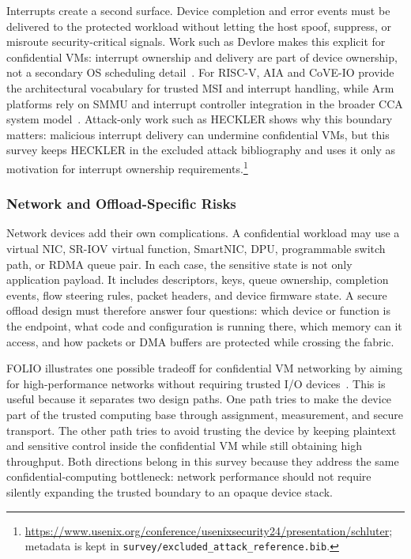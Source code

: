 Interrupts create a second surface. Device completion and error events must be
delivered to the protected workload without letting the host spoof, suppress, or
misroute security-critical signals. Work such as Devlore makes this explicit
for confidential VMs: interrupt ownership and delivery are part of device
ownership, not a secondary OS scheduling detail~\cite{bertschi2026devlore}.
For RISC-V, AIA and CoVE-IO provide the architectural vocabulary for trusted MSI
and interrupt handling, while Arm platforms rely on SMMU and interrupt
controller integration in the broader CCA system model~\cite{riscv_aia_2023,riscv_cove_io_2026,arm_smmu_spec}.
Attack-only work such as HECKLER shows why this boundary matters: malicious
interrupt delivery can undermine confidential VMs, but this survey keeps
HECKLER in the excluded attack bibliography and uses it only as motivation for
interrupt ownership requirements.\footnote{\url{https://www.usenix.org/conference/usenixsecurity24/presentation/schluter};
metadata is kept in \texttt{survey/excluded\_attack\_reference.bib}.}

\subsubsection{Network and Offload-Specific Risks}

Network devices add their own complications. A confidential workload may use a
virtual NIC, SR-IOV virtual function, SmartNIC, DPU, programmable switch path,
or RDMA queue pair. In each case, the sensitive state is not only application
payload. It includes descriptors, keys, queue ownership, completion events,
flow steering rules, packet headers, and device firmware state. A secure
offload design must therefore answer four questions: which device or function
is the endpoint, what code and configuration is running there, which memory can
it access, and how packets or DMA buffers are protected while crossing the
fabric.

FOLIO illustrates one possible tradeoff for confidential VM networking by
aiming for high-performance networks without requiring trusted I/O
devices~\cite{li2024folio}. This is useful because it separates two design
paths. One path tries to make the device part of the trusted computing base
through assignment, measurement, and secure transport. The other path tries to
avoid trusting the device by keeping plaintext and sensitive control inside the
confidential VM while still obtaining high throughput. Both directions belong
in this survey because they address the same confidential-computing bottleneck:
network performance should not require silently expanding the trusted boundary
to an opaque device stack.

